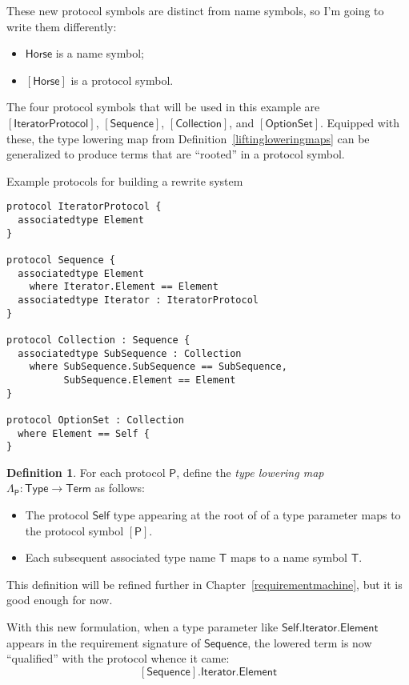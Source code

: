 \documentclass[headsepline,bibliography=totoc]{scrreport}
\newcommand{\namesym}[1]{\mathsf{#1}}
\newcommand{\genericparam}[1]{\bm{\mathsf{#1}}}
\newcommand{\proto}[1]{\bm{\mathsf{#1}}}
\newcommand{\protosym}[1]{[\proto{#1}]}
\theoremstyle{definition}
\theoremstyle{definition}
\newtheorem{definition}{Definition}[chapter]
\theoremstyle{definition}
\begin{document}
These new protocol symbols are distinct from name symbols, so I'm going to write them differently:
\begin{itemize}
\item $\namesym{Horse}$ is a name symbol;
\item $\protosym{Horse}$ is a protocol symbol.
\end{itemize}
The four protocol symbols that will be used in this example are $\protosym{IteratorProtocol}$, $\protosym{Sequence}$, $\protosym{Collection}$, and $\protosym{OptionSet}$. Equipped with these, the type lowering map from Definition~\ref{liftingloweringmaps} can be generalized to produce terms that are ``rooted'' in a protocol symbol.

\begin{listing}\caption{Example protocols for building a rewrite system}\label{protocolrewritesystemex}
\begin{Verbatim}
protocol IteratorProtocol {
  associatedtype Element
}

protocol Sequence {
  associatedtype Element
    where Iterator.Element == Element
  associatedtype Iterator : IteratorProtocol
}

protocol Collection : Sequence {
  associatedtype SubSequence : Collection
    where SubSequence.SubSequence == SubSequence,
          SubSequence.Element == Element
}

protocol OptionSet : Collection
  where Element == Self {
}
\end{Verbatim}
\end{listing}

\begin{definition}\label{typelowering1} For each protocol $\proto{P}$, define the \emph{type lowering map} $\Lambda_{\proto{P}}:\mathsf{Type}\rightarrow\mathsf{Term}$ as follows:
\begin{itemize}
\item The protocol $\genericparam{Self}$ type appearing at the root of of a type parameter maps to the protocol symbol $\protosym{P}$.
\item Each subsequent associated type name $\namesym{T}$ maps to a name symbol $\namesym{T}$.
\end{itemize}
This definition will be refined further in Chapter~\ref{requirementmachine}, but it is good enough for now.
\end{definition}
With this new formulation, when a type parameter like $\genericparam{Self}.\namesym{Iterator}.\namesym{Element}$ appears in the requirement signature of $\proto{Sequence}$, the lowered term is now ``qualified'' with the protocol whence it came:
\[\protosym{Sequence}.\namesym{Iterator}.\namesym{Element}\]
\end{document}
